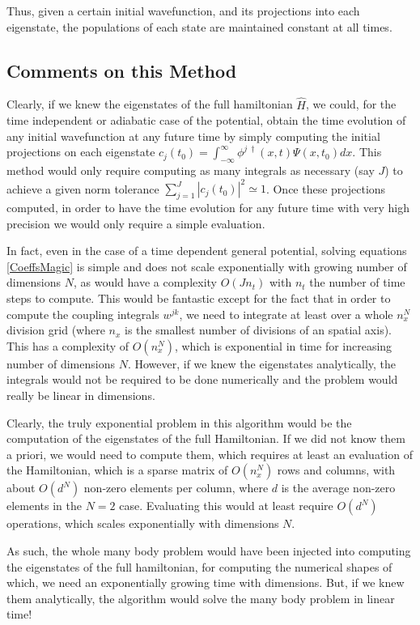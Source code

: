 \documentclass[11pt, a4paper]{article} %
\begin{document}
Thus, given a certain initial wavefunction, and its projections into each eigenstate, the populations of each state are maintained constant at all times.

\subsection{Comments on this Method}
Clearly, if we knew the eigenstates of the full hamiltonian $\hat{H}$, we could, for the time independent or adiabatic case of the potential, obtain the time evolution of any initial wavefunction at any future time by simply computing the initial projections on each eigenstate $c_j(t_0)=\int_{-\infty}^{\infty}\phi^{j\ \dagger}(x,t) \Psi(x,t_0)dx$. This method would only require computing as many integrals as necessary (say $J$) to achieve a given norm tolerance $\sum_{j=1}^J |c_j(t_0)|^2\simeq 1$. Once these projections computed, in order to have the time evolution for any future time with very high precision we would only require a simple evaluation. 

In fact, even in the case of a time dependent general potential, solving equations \eqref{CoeffsMagic} is simple and does not scale exponentially with growing number of dimensions $N$, as would have a complexity $O(Jn_t)$ with $n_t$ the number of time steps to compute. This would be fantastic except for the fact that in order to compute the coupling integrals $w^{jk}$, we need to integrate at least over a whole $n_x^N$ division grid (where $n_x$ is the smallest number of divisions of an spatial axis). This has a complexity of $O(n_x^N)$, which is exponential in time for increasing number of dimensions $N$. However, if we knew the eigenstates analytically, the integrals would not be required to be done numerically and the problem would really be linear in dimensions.

Clearly, the truly exponential problem in this algorithm would be the computation of the eigenstates of the full Hamiltonian. If we did not know them a priori, we would need to compute them, which requires at least an evaluation of the Hamiltonian, which is a sparse matrix of $O(n_x^N)$ rows and columns, with about $O(d^N)$ non-zero elements per column, where $d$ is the average non-zero elements in the $N=2$ case. Evaluating this would at least require $O(d^N)$ operations, which scales exponentially with dimensions $N$.

As such, the whole many body problem would have been injected into computing the eigenstates of the full hamiltonian, for computing the numerical shapes of which, we need an exponentially growing time with dimensions. But, if we knew them analytically, the algorithm would solve the many body problem in linear time!
\end{document}
